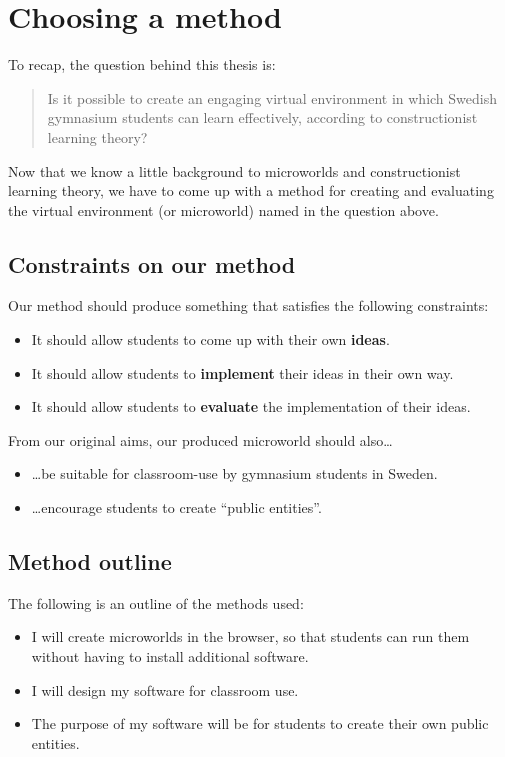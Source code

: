 \section{Choosing a method}

To recap, the question behind this thesis is:
\begin{quote}
Is it possible to create an engaging virtual environment in which Swedish gymnasium students can learn effectively, according to constructionist learning theory?
\end{quote}

Now that we know a little background to microworlds and constructionist learning theory, we have to come up with a method for creating and evaluating the virtual environment (or microworld) named in the question above.

\subsection{Constraints on our method}

Our method should produce something that satisfies the following constraints:
\begin{itemize}
  \item It should allow students to come up with their own \textbf{ideas}.
  \item It should allow students to \textbf{implement} their ideas in their own way.
  \item It should allow students to \textbf{evaluate} the implementation of their ideas.
\end{itemize}

From our original aims, our produced microworld should also\ldots
\begin{itemize}
  \item \ldots be suitable for classroom-use by gymnasium students in Sweden.
  \item \ldots encourage students to create ``public entities''.
\end{itemize}

\subsection{Method outline}

The following is an outline of the methods used:
\begin{itemize}
  \item I will create microworlds in the browser, so that students can run them without having to install additional software.
  \item I will design my software for classroom use.
  \item The purpose of my software will be for students to create their own public entities.
\end{itemize}

